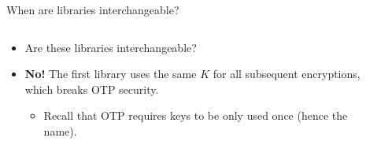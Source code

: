 \documentclass[aspectratio=169, lualatex, handout]{beamer}
\begin{document}
\begin{frame}{When are libraries interchangeable?}
	\begin{columns}[c]
		\begin{column}{0.5\textwidth}
			\begin{itemize}[<+->]
				\item Are these libraries interchangeable?
				\item \textbf{No!} The first library uses the same $K$ for all subsequent encryptions, which breaks OTP security.
				      \begin{itemize}
					      \item Recall that OTP requires keys to be only used once (hence the name).
				      \end{itemize}
			\end{itemize}
		\end{column}
		\begin{column}{0.05\textwidth}
		\end{column}
		\begin{column}{0.45\textwidth}
		\end{column}
	\end{columns}
\end{frame}
\end{document}
